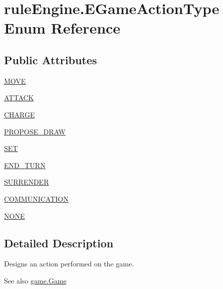 \hypertarget{enumrule_engine_1_1_e_game_action_type}{}\section{rule\+Engine.\+E\+Game\+Action\+Type Enum Reference}
\label{enumrule_engine_1_1_e_game_action_type}
\subsection*{Public Attributes}
\begin{DoxyCompactItemize}
\item 
\mbox{\hyperlink{enumrule_engine_1_1_e_game_action_type_a0dbc15180da4ebaa27020e423fc2a779}{M\+O\+VE}}
\item 
\mbox{\hyperlink{enumrule_engine_1_1_e_game_action_type_a68ea2d0cd9f77be778b1dc9e9de13845}{A\+T\+T\+A\+CK}}
\item 
\mbox{\hyperlink{enumrule_engine_1_1_e_game_action_type_ac40114f8df9fa5c69de0f3e0f32a3b7e}{C\+H\+A\+R\+GE}}
\item 
\mbox{\hyperlink{enumrule_engine_1_1_e_game_action_type_aa525eb79f1cae41a675aec96442b1936}{P\+R\+O\+P\+O\+S\+E\+\_\+\+D\+R\+AW}}
\item 
\mbox{\hyperlink{enumrule_engine_1_1_e_game_action_type_a98ba58ea07e844617643a1ac9aa33f8f}{S\+ET}}
\item 
\mbox{\hyperlink{enumrule_engine_1_1_e_game_action_type_a10af2b05dabb63531664a5af94db37cd}{E\+N\+D\+\_\+\+T\+U\+RN}}
\item 
\mbox{\hyperlink{enumrule_engine_1_1_e_game_action_type_a32e79f02ec606bc9a4258853525e47b9}{S\+U\+R\+R\+E\+N\+D\+ER}}
\item 
\mbox{\hyperlink{enumrule_engine_1_1_e_game_action_type_a2c7abde87bb65fcb15c3998f1ad10ecc}{C\+O\+M\+M\+U\+N\+I\+C\+A\+T\+I\+ON}}
\item 
\mbox{\hyperlink{enumrule_engine_1_1_e_game_action_type_aeea36ba81c260f33e8f9f509aa1b808e}{N\+O\+NE}}
\end{DoxyCompactItemize}


\subsection{Detailed Description}
Designs an action performed on the game.

\begin{DoxySeeAlso}{See also}
\mbox{\hyperlink{classgame_1_1_game}{game.\+Game}} 
\end{DoxySeeAlso}


